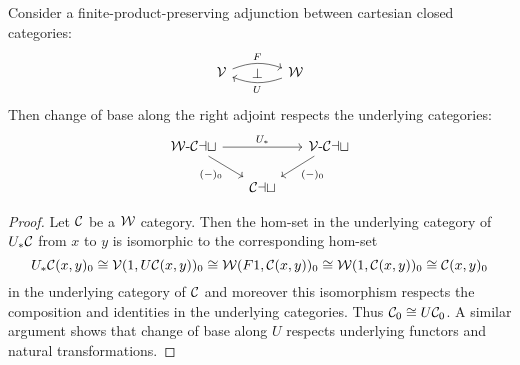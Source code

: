 \begin{lem}\label{lem:right-of-monoidal-adj-ucats} Consider a finite-product-preserving adjunction between cartesian closed categories:
\[
\begin{tikzcd}[column sep=large]
\cV \arrow[r, bend left=20, "F"] \arrow[r, phantom, "\bot"] & \cW \arrow[l, bend left=20, "U"]   \end{tikzcd}
\]
Then change of base along the right adjoint respects the underlying categories:
\[
\begin{tikzcd}[sep=1.5 em] \eCat{\cW} \arrow[rr, "U_*"] \arrow[dr, "{(-)_0}"'] & & \eCat{\cV} \arrow[dl, "(-)_0"] \\ & \Cat
\end{tikzcd}
\]
\end{lem}
\begin{proof}
Let ${\mathord{\mathcal{C}}}$ be a ${\mathord{\mathcal{W}}}$ category. Then the hom-set in the underlying category of $U_*{\mathord{\mathcal{C}}}$ from $x$ to $y$ is isomorphic to the corresponding hom-set
\[ U_*{\mathord{\mathcal{C}}}(x,y)_0 \cong {\mathord{\mathcal{V}}}(1, U{\mathord{\mathcal{C}}}(x,y))_0 \cong {\mathord{\mathcal{W}}}(F1,{\mathord{\mathcal{C}}}(x,y))_0 \cong {\mathord{\mathcal{W}}}(1,{\mathord{\mathcal{C}}}(x,y))_0 \cong {\mathord{\mathcal{C}}}(x,y)_0\]
in the underlying category of ${\mathord{\mathcal{C}}}$ and moreover this isomorphism respects the composition and identities in the underlying categories. Thus ${\mathord{\mathcal{C}}}_0 \cong U{\mathord{\mathcal{C}}}_0$. A similar argument shows that change of base along $U$ respects underlying functors and natural transformations.
\end{proof}



